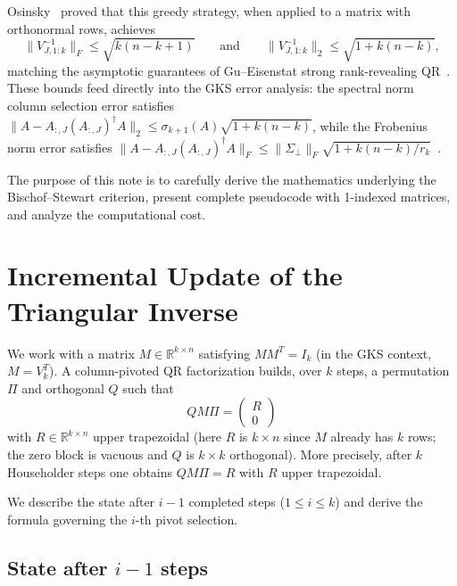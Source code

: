 \documentclass[11pt]{article}
\theoremstyle{definition}
\theoremstyle{remark}
\newcommand{\R}{\mathbb{R}}
\newcommand{\fnorm}[1]{\lVert #1 \rVert_F}
\newcommand{\tnorm}[1]{\lVert #1 \rVert_2}
\begin{document}
Osinsky~\cite{osinsky2025close} proved that this greedy strategy,
when applied to a matrix with orthonormal rows, achieves
\begin{equation}\label{eq:osinsky-bounds}
  \fnorm{V_{J,1:k}^{-1}} \leq \sqrt{k(n-k+1)}
  \qquad\text{and}\qquad
  \tnorm{V_{J,1:k}^{-1}} \leq \sqrt{1 + k(n-k)},
\end{equation}
matching the asymptotic guarantees of Gu--Eisenstat strong rank-revealing
QR~\cite{gu_srrqr}.  These bounds feed directly into the GKS error
analysis: the spectral norm column selection error satisfies
$\tnorm{A - A_{:,J}(A_{:,J})^\dagger A} \leq \sigma_{k+1}(A)\sqrt{1 +
k(n-k)}$, while the Frobenius norm error satisfies $\fnorm{A -
A_{:,J}(A_{:,J})^\dagger A} \leq \fnorm{\Sigma_\bot}\sqrt{1 +
k(n-k)/r_k}$~\cite{armstrong2025structure}.

The purpose of this note is to carefully derive the mathematics
underlying the Bischof--Stewart criterion, present complete pseudocode
with 1-indexed matrices, and analyze the computational cost.

\section{Incremental Update of the Triangular Inverse}
\label{sec:incremental}

We work with a matrix $M \in \R^{k \times n}$ satisfying $MM^T =
I_k$ (in the GKS context, $M = V_k^T$).  A column-pivoted QR
factorization builds, over $k$ steps, a permutation $\Pi$ and
orthogonal $Q$ such that
\[
  QM\Pi = \begin{pmatrix} R \\ 0 \end{pmatrix}
\]
with $R \in \R^{k \times n}$ upper trapezoidal (here $R$ is $k \times
n$ since $M$ already has $k$ rows; the zero block is vacuous and $Q$
is $k \times k$ orthogonal).  More precisely, after $k$ Householder
steps one obtains $QM\Pi = R$ with $R$ upper trapezoidal.

We describe the state after $i - 1$ completed steps ($1 \leq i \leq
k$) and derive the formula governing the $i$-th pivot selection.

\subsection{State after \texorpdfstring{$i-1$}{i-1} steps}
\end{document}
